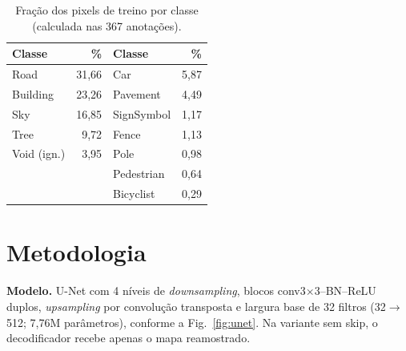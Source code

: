 \documentclass[10pt,a4paper,twocolumn]{article}
\begin{document}
\begin{table}[h]
\centering\small
\caption{Fração dos pixels de treino por classe (calculada nas 367 anotações).}
\label{tab:classes}
\setlength{\tabcolsep}{4pt}
\begin{tabular}{lr@{\hskip 14pt}lr}
\toprule
Classe & \% & Classe & \% \\
\midrule
Road & 31,66 & Car & 5,87 \\
Building & 23,26 & Pavement & 4,49 \\
Sky & 16,85 & SignSymbol & 1,17 \\
Tree & 9,72 & Fence & 1,13 \\
Void (ign.) & 3,95 & Pole & 0,98 \\
 & & Pedestrian & 0,64 \\
 & & Bicyclist & 0,29 \\
\bottomrule
\end{tabular}
\end{table}

\section{Metodologia}
\textbf{Modelo.} U-Net com 4 níveis de \emph{downsampling}, blocos
conv3$\times$3--BN--ReLU duplos, \emph{upsampling} por convolução transposta e largura
base de 32 filtros (32$\rightarrow$512; 7,76M parâmetros), conforme a
Fig.~\ref{fig:unet}. Na variante sem skip, o decodificador recebe apenas o mapa
reamostrado.
\end{document}
